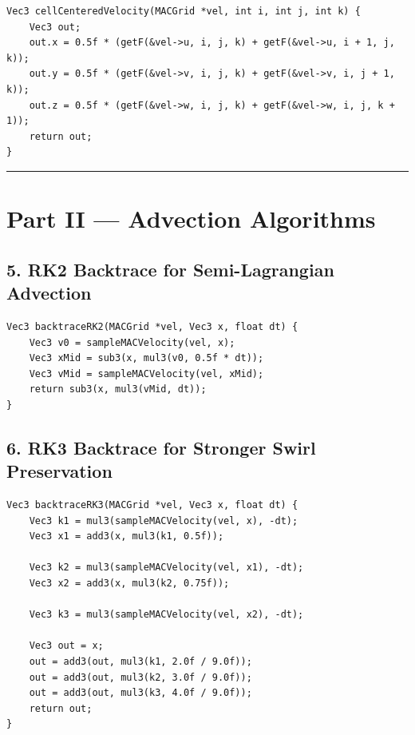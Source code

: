 \documentclass[10pt,letterpaper]{article}
\begin{document}
\begin{verbatim}
Vec3 cellCenteredVelocity(MACGrid *vel, int i, int j, int k) {
    Vec3 out;
    out.x = 0.5f * (getF(&vel->u, i, j, k) + getF(&vel->u, i + 1, j, k));
    out.y = 0.5f * (getF(&vel->v, i, j, k) + getF(&vel->v, i, j + 1, k));
    out.z = 0.5f * (getF(&vel->w, i, j, k) + getF(&vel->w, i, j, k + 1));
    return out;
}
\end{verbatim}

\medskip\hrule\medskip

\clearpage
{}
\section*{Part II --- Advection Algorithms}

\subsection*{5. RK2 Backtrace for Semi-Lagrangian Advection}

\begin{verbatim}
Vec3 backtraceRK2(MACGrid *vel, Vec3 x, float dt) {
    Vec3 v0 = sampleMACVelocity(vel, x);
    Vec3 xMid = sub3(x, mul3(v0, 0.5f * dt));
    Vec3 vMid = sampleMACVelocity(vel, xMid);
    return sub3(x, mul3(vMid, dt));
}
\end{verbatim}

\subsection*{6. RK3 Backtrace for Stronger Swirl Preservation}

\begin{verbatim}
Vec3 backtraceRK3(MACGrid *vel, Vec3 x, float dt) {
    Vec3 k1 = mul3(sampleMACVelocity(vel, x), -dt);
    Vec3 x1 = add3(x, mul3(k1, 0.5f));

    Vec3 k2 = mul3(sampleMACVelocity(vel, x1), -dt);
    Vec3 x2 = add3(x, mul3(k2, 0.75f));

    Vec3 k3 = mul3(sampleMACVelocity(vel, x2), -dt);

    Vec3 out = x;
    out = add3(out, mul3(k1, 2.0f / 9.0f));
    out = add3(out, mul3(k2, 3.0f / 9.0f));
    out = add3(out, mul3(k3, 4.0f / 9.0f));
    return out;
}
\end{verbatim}
\end{document}
